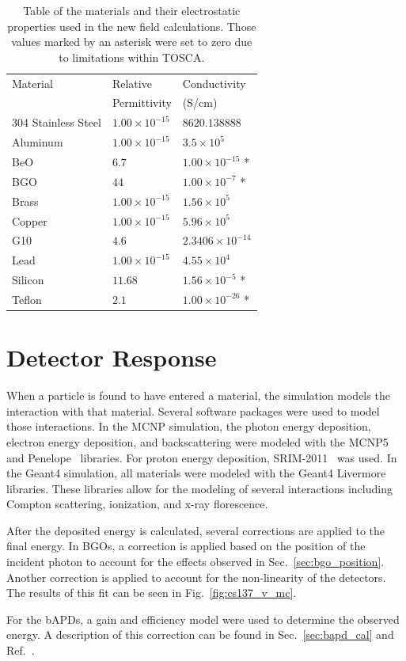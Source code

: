 \documentclass[oneside,12pt]{memoir}
\begin{document}
\begin{table}[t]
	\centering
	\begin{tabular}{|l|l|l|} \hline
		Material & Relative & Conductivity\\
		& Permittivity & (S/cm) \\\hline
		304 Stainless Steel & $1.00\times 10^{-15}$ & $8620.138888$ \\\hline
		Aluminum & $1.00\times 10^{-15}$ & $3.5\times 10^{5}$ \\\hline
		BeO & $6.7$ & $1.00\times 10^{-15}$ * \\\hline
		BGO & $44$ & $1.00\times 10^{-7}$ * \\\hline
		Brass & $1.00\times 10^{-15}$ & $1.56\times 10^{5}$ \\\hline
		Copper & $1.00\times 10^{-15}$ & $5.96\times 10^5$ \\\hline
		G10 & $4.6$ & $2.3406\times 10^{-14}$ \\\hline
		Lead & $1.00\times 10^{-15}$ & $4.55\times 10^4$ \\\hline
		Silicon & $11.68$ & $1.56\times 10^{-5}$ * \\\hline
		Teflon & $2.1$ & $1.00\times 10^{-26}$ * \\\hline
	\end{tabular}
	\caption[Table of materials and electrostatic properties.]{Table of the materials and their electrostatic properties used in the new field calculations. Those values marked by an asterisk were set to zero due to limitations within TOSCA.}
	\label{tab:materials}
\end{table}

\section{Detector Response}
\label{sec:mcdetresp}
When a particle is found to have entered a material, the simulation models the interaction with that material. Several software packages were used to model those interactions. In the MCNP simulation, the photon energy deposition, electron energy deposition, and backscattering were modeled with the MCNP5 and Penelope~\cite{Prasad1976103} libraries. For proton energy deposition, SRIM-2011~\cite{Ziegler1988215} was used. In the Geant4 simulation, all materials were modeled with the Geant4 Livermore libraries. These libraries allow for the modeling of several interactions including Compton scattering, ionization, and x-ray florescence.\par
After the deposited energy is calculated, several corrections are applied to the final energy. In BGOs, a correction is applied based on the position of the incident photon to account for the effects observed in Sec.~\ref{sec:bgo_position}. Another correction is applied to account for the non-linearity of the detectors. The results of this fit can be seen in Fig.~\ref{fig:cs137_v_mc}.\par
For the bAPDs, a gain and efficiency model were used to determine the observed energy. A description of this correction can be found in Sec.~\ref{sec:bapd_cal} and Ref.~\cite{gentile12a}.
\end{document}
